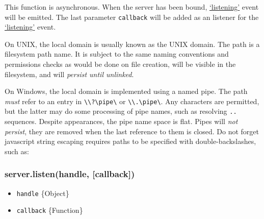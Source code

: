 This function is asynchronous. When the server has been bound,
\hyperref[netux5feventux5flistening]{`listening'} event will be emitted.
The last parameter \texttt{callback} will be added as an listener for
the \hyperref[netux5feventux5flistening]{`listening'} event.

On UNIX, the local domain is usually known as the UNIX domain. The path
is a filesystem path name. It is subject to the same naming conventions
and permissions checks as would be done on file creation, will be
visible in the filesystem, and will \emph{persist until unlinked}.

On Windows, the local domain is implemented using a named pipe. The path
\emph{must} refer to an entry in
\texttt{\textbackslash{}\textbackslash{}?\textbackslash{}pipe\textbackslash{}}
or
\texttt{\textbackslash{}\textbackslash{}.\textbackslash{}pipe\textbackslash{}}.
Any characters are permitted, but the latter may do some processing of
pipe names, such as resolving \texttt{..} sequences. Despite
appearances, the pipe name space is flat. Pipes will \emph{not persist},
they are removed when the last reference to them is closed. Do not
forget javascript string escaping requires paths to be specified with
double-backslashes, such as:

\begin{Shaded}
\begin{Highlighting}[]
\NormalTok{(}
    \NormalTok{(}\CharTok{\textbackslash{}\textbackslash{}\textbackslash{}\textbackslash{}}\CharTok{\textbackslash{}\textbackslash{}}\NormalTok{, }\NormalTok{(), }\NormalTok{))}
\end{Highlighting}
\end{Shaded}

\subsubsection{server.listen(handle,
{[}callback{]})}\label{server.listenhandle-callback}

\begin{itemize}
\itemsep1pt\parskip0pt
\item
  \texttt{handle} \{Object\}
\item
  \texttt{callback} \{Function\}
\end{itemize}

